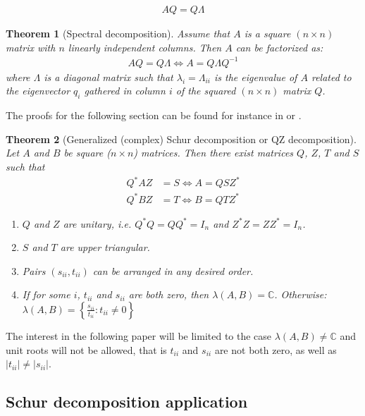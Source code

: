 \documentclass{pracamgr}
\numberwithin{equation}{section}
\newtheorem{theorem}{Theorem}
\begin{document}
\begin{align}
AQ = Q\Lambda
\end{align}

\begin{theorem}[Spectral decomposition]
Assume that $A$ is a square $(n\times n)$ matrix with $n$ linearly independent columns. Then $A$ can be factorized as:
  \begin{align*}
  AQ = Q \Lambda \Leftrightarrow A = Q \Lambda Q^{-1}
  \end{align*} 
where $\Lambda$ is a diagonal matrix such that $\lambda_i =\Lambda_{ii}$ is the eigenvalue of $A$ related to the eigenvector $q_i$ gathered in column $i$ of the squared $(n \times n)$ matrix $Q$.
\end{theorem}

The proofs for the following section can be found for instance in \citet{roman2008graduate} or \citet{brown1988second}.  

\begin{theorem}[Generalized (complex) Schur decomposition or QZ decomposition]
Let $A$ and $B$ be square ($n\times n$) matrices. Then there exist matrices $Q$, $Z$, $T$ and $S$ such that
\begin{align*}
  Q^* A Z &= S \Leftrightarrow A = Q S Z^*\\
  Q^* B Z &= T \Leftrightarrow B = Q T Z^*
\end{align*}
\begin{enumerate}
  \item $Q$ and $Z$ are unitary, i.e. $Q^*Q=QQ^*=I_n$ and $Z^*Z=ZZ^*=I_n$.
  \item $S$ and $T$ are upper triangular.
 \item Pairs $(s_{ii},t_{ii})$ can be arranged in any desired order.
  \item If for some $i$, $t_{ii}$ and $s_{ii}$ are both zero, then $\lambda(A,B)=\mathbb{C}$. Otherwise:
$\lambda(A,B) = \left\{\frac{s_{ii}}{t_{ii}}:t_{ii} \neq 0 \right\}$
\end{enumerate}
\end{theorem}

The interest in the following paper will be limited to the case $\lambda(A,B)\neq \mathbb{C}$ and unit roots will not be allowed, that is $t_{ii}$ and $s_{ii}$ are not both zero, as well as $|t_{ii}|\neq |s_{ii}|$.

\subsection{Schur decomposition application}
\end{document}
